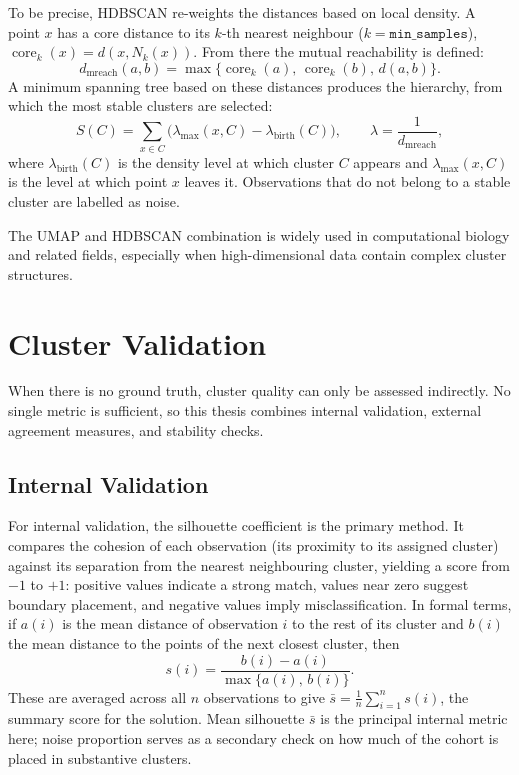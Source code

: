 To be precise, HDBSCAN re-weights the distances based on local density. A point $x$ has a core distance to its $k$-th nearest neighbour ($k=\texttt{min\_samples}$), $\operatorname{core}_k(x)=d\!\left(x,N_k(x)\right)$. From there the mutual reachability is defined:
\begin{equation}\label{eq:mreach}
d_{\mathrm{mreach}}(a,b)=\max\bigl\{\operatorname{core}_k(a),\,\operatorname{core}_k(b),\,d(a,b)\bigr\}.
\end{equation}
A minimum spanning tree based on these distances produces the hierarchy, from which the most stable clusters are selected:
\begin{equation}\label{eq:hdbscan_stab}
S(C)=\sum_{x\in C}\bigl(\lambda_{\max}(x,C)-\lambda_{\mathrm{birth}}(C)\bigr),\qquad \lambda=\frac{1}{d_{\mathrm{mreach}}},
\end{equation}
where $\lambda_{\mathrm{birth}}(C)$ is the density level at which cluster $C$ appears and $\lambda_{\max}(x,C)$ is the level at which point $x$ leaves it. Observations that do not belong to a stable cluster are labelled as noise.

The UMAP and HDBSCAN combination is widely used in computational biology and related fields, especially when high-dimensional data contain complex cluster structures.


\section{Cluster Validation}

When there is no ground truth, cluster quality can only be assessed indirectly. No single metric is sufficient, so this thesis combines internal validation, external agreement measures, and stability checks.

\subsection{Internal Validation}

For internal validation, the silhouette coefficient \parencite{rousseeuw1987silhouettes} is the primary method. It compares the cohesion of each observation (its proximity to its assigned cluster) against its separation from the nearest neighbouring cluster, yielding a score from $-1$ to $+1$: positive values indicate a strong match, values near zero suggest boundary placement, and negative values imply misclassification. In formal terms, if $a(i)$ is the mean distance of observation $i$ to the rest of its cluster and $b(i)$ the mean distance to the points of the next closest cluster, then
\begin{equation}\label{eq:silhouette}
s(i)=\frac{b(i)-a(i)}{\max\{a(i),\,b(i)\}}.
\end{equation}
These are averaged across all $n$ observations to give $\bar{s}=\frac{1}{n}\sum_{i=1}^{n}s(i)$, the summary score for the solution. Mean silhouette $\bar{s}$ is the principal internal metric here; noise proportion serves as a secondary check on how much of the cohort is placed in substantive clusters.

